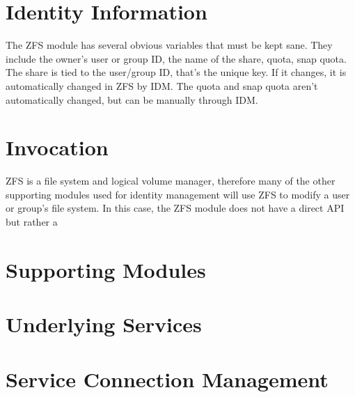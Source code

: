 \documentclass[letterpaper,12pt,titlepage]{article}
\begin{document}
\section{Identity Information}
The ZFS module has several obvious variables that must be kept sane. They include the owner's user or group ID, the name of the share, quota, snap quota. The share is tied to the user/group ID, that's the unique key. If it changes, it is automatically changed in ZFS by IDM. The quota and snap quota aren't automatically changed, but can be manually through IDM. 


\section{Invocation}
ZFS is a file system and logical volume manager, therefore many of the other
supporting modules used for identity management will use ZFS to modify
a user or group's file system. In this case, the ZFS module does not have a
direct API but rather a 


\section{Supporting Modules}


\section{Underlying Services}

\section{Service Connection Management}
\end{document}
